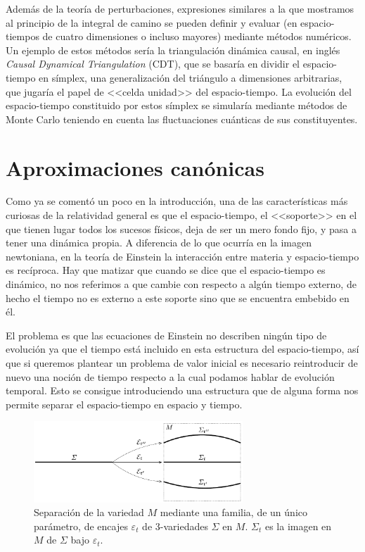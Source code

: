 \documentclass[11pt,a4paper,titlepage]{article}
\begin{document}
Además de la teoría de perturbaciones, expresiones similares a la que mostramos al principio de la integral de camino se pueden definir y evaluar (en espacio-tiempos de cuatro dimensiones o incluso mayores) mediante métodos numéricos. Un ejemplo de estos métodos sería la triangulación dinámica causal, en inglés \emph{Causal Dynamical Triangulation} (CDT), que se basaría en dividir el espacio-tiempo en símplex, una generalización del triángulo a dimensiones arbitrarias, que jugaría el papel de <<celda unidad>> del espacio-tiempo. La evolución del espacio-tiempo constituido por estos símplex se simularía mediante métodos de Monte Carlo teniendo en cuenta las fluctuaciones cuánticas de sus constituyentes.
%
%
%
%
\newpage
\section{Aproximaciones canónicas} %

Como ya se comentó un poco en la introducción, una de las características más curiosas de la relatividad general es que el espacio-tiempo, el <<soporte>> en el que tienen lugar todos los sucesos físicos, deja de ser un mero fondo fijo, y pasa a tener una dinámica propia. A diferencia de lo que ocurría en la imagen newtoniana, en la teoría de Einstein la interacción entre materia y espacio-tiempo es recíproca. Hay que matizar que cuando se dice que el espacio-tiempo es dinámico, no nos referimos a que cambie con respecto a algún tiempo externo, de hecho el tiempo no es externo a este soporte sino que se encuentra embebido en él.

El problema es que las ecuaciones de Einstein no describen ningún tipo de evolución ya que el tiempo está incluido en esta estructura del espacio-tiempo, así que si queremos plantear un problema de valor inicial es necesario reintroducir de nuevo una noción de tiempo respecto a la cual podamos hablar de evolución temporal. Esto se consigue introduciendo una estructura que de alguna forma nos permite separar el espacio-tiempo en espacio y tiempo.

\begin{figure}[ht]
\centering
\includegraphics[width=0.7\textwidth]{FoilM.png}
\caption{Separación de la variedad $M$ mediante una familia, de un único parámetro, de encajes $\varepsilon_t$ de 3-variedades $\Sigma$ en $M$. $\Sigma_t$ es la imagen en $M$ de $\Sigma$ bajo $\varepsilon_t$.}
\label{fig:FoilM}
\end{figure}
\end{document}

